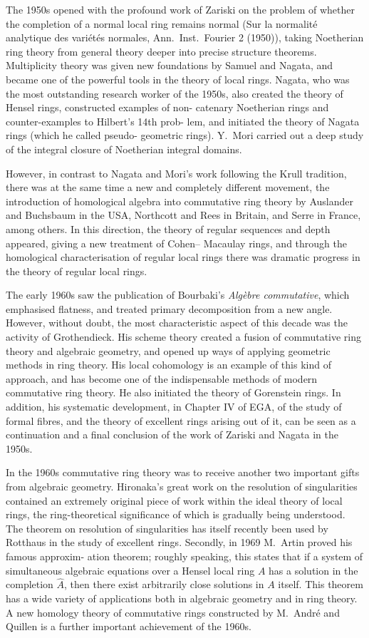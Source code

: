 The 1950s opened with the profound work of Zariski on the problem of
whether the completion of a normal local ring remains normal (Sur la
normalit\'e analytique des vari\'et\'es normales, Ann.\ Inst.\ Fourier 2 (1950)),
taking Noetherian ring theory from general theory deeper into precise
structure theorems. Multiplicity theory was given new foundations by
Samuel and Nagata, and became one of the powerful tools in the theory of
local rings. Nagata, who was the most outstanding research worker of the
1950s, also created the theory of Hensel rings, constructed examples of non-
catenary Noetherian rings and counter-examples to Hilbert's 14th prob-
lem, and initiated the theory of Nagata rings (which he called pseudo-
geometric rings). Y.\ Mori carried out a deep study of the integral closure
of Noetherian integral domains.

However, in contrast to Nagata and Mori's work following the Krull
tradition, there was at the same time a new and completely different
movement, the introduction of homological algebra into commutative ring
theory by Auslander and Buchsbaum in the USA, Northcott and Rees in
Britain, and Serre in France, among others. In this direction, the theory of
regular sequences and depth appeared, giving a new treatment of Cohen--
Macaulay rings, and through the homological characterisation of regular
local rings there was dramatic progress in the theory of regular local rings.

The early 1960s saw the publication of Bourbaki's \textit{Alg\`ebre commutative},
which emphasised flatness, and treated primary decomposition from a new
angle. However, without doubt, the most characteristic aspect of this
decade was the activity of Grothendieck. His scheme theory created a
fusion of commutative ring theory and algebraic geometry, and opened up
ways of applying geometric methods in ring theory. His local cohomology
is an example of this kind of approach, and has become one of the
indispensable methods of modern commutative ring theory. He also
initiated the theory of Gorenstein rings. In addition, his systematic
development, in Chapter IV of EGA, of the study of formal fibres, and the
theory of excellent rings arising out of it, can be seen as a continuation and a
final conclusion of the work of Zariski and Nagata in the 1950s.

In the 1960s commutative ring theory was to receive another two
important gifts from algebraic geometry. Hironaka's great work on the
resolution of singularities~\cite{Hir1} contained an extremely original piece of
work within the ideal theory of local rings, the ring-theoretical significance
of which is gradually being understood. The theorem on resolution of
singularities has itself recently been used by Rotthaus in the study of
excellent rings. Secondly, in 1969 M.\ Artin proved his famous approxim-
ation theorem; roughly speaking, this states that if a system of simultaneous
algebraic equations over a Hensel local ring $A$ has a solution in the
completion $\hat{A}$, then there exist arbitrarily close solutions in $A$ itself. This
theorem has a wide variety of applications both in algebraic geometry and
in ring theory. A new homology theory of commutative rings constructed
by M.\ Andr\'e and Quillen is a further important achievement of the 1960s.

